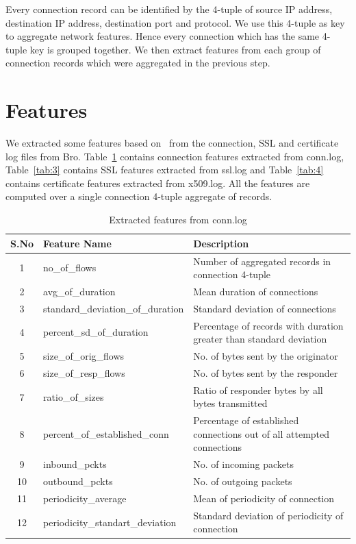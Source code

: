 Every connection record can be identified by the 4-tuple of source IP address, destination IP address, destination port and protocol. We use this 4-tuple as key to aggregate network features. Hence every connection which has the same 4-tuple key is grouped together. We then extract features from each group of connection records which were aggregated in the previous step.

\section{Features}

We extracted some features based on~\cite{Frantisek2017, AndersonM16} from the connection, SSL and certificate log files from Bro. Table~\ref{tab:2} contains connection features extracted from conn.log, Table~\ref{tab:3} contains SSL features extracted from ssl.log and Table~\ref{tab:4} contains certificate features extracted from x509.log. All the features are computed over a single connection 4-tuple aggregate of records.

\begin{table}[!htb]
	\caption{Extracted features from conn.log\label{tab:2}}
	\begin{center}
		\begin{tabular}{c|p{}|p{}}\hline\hline
			S.No & Feature Name & \multicolumn{1}{l}{Description} \\ \hline
			1 & no\_of\_flows & Number of aggregated records in connection 4-tuple\\
			2 & avg\_of\_duration & Mean duration of connections \\
			3 & standard\_deviation\_of\_duration & Standard deviation of connections\\
			4 & percent\_sd\_of\_duration & Percentage of records with duration greater than standard deviation\\
			5 & size\_of\_orig\_flows & No. of bytes sent by the originator\\
			6 & size\_of\_resp\_flows & No. of bytes sent by the responder\\
			7 & ratio\_of\_sizes & Ratio of responder bytes by all bytes transmitted \\
			8 & percent\_of\_established\_conn & Percentage of established connections out of all attempted connections\\
			9 & inbound\_pckts & No. of incoming packets\\
			10 & outbound\_pckts & No. of outgoing packets\\
			11 & periodicity\_average & Mean of periodicity of connection\\
			12 & periodicity\_standart\_deviation & Standard deviation of periodicity of connection\\
			\hline\hline
		\end{tabular}
	\end{center}
\end{table}

